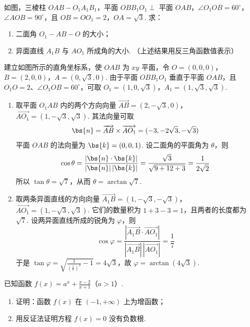 \begin{problem}
如图，三棱柱 \(OAB - O_{1}A_{1}B_{1}\)，平面 \(OBB_{1}O_{1} \perp\) 平面 \(OAB\)，\(\angle O_{1}OB = 60^{\circ}\)，\(\angle AOB = 90^{\circ}\)，且 \(OB = OO_{1} = 2\)，\(OA = \sqrt{3}\). 求：
\begin{enumerate}
\item 二面角 \(O_{1} - AB - O\) 的大小；
\item 异面直线 \(A_{1}B\) 与 \(AO_{1}\) 所成角的大小. （上述结果用反三角函数值表示）
\end{enumerate}

\end{problem}

\begin{solution}
建立如图所示的直角坐标系，使 \(OAB\) 为 \(xy\) 平面，令
\(O=(0,0,0)\)，\(B=(2,0,0)\)，\(A=(0,\sqrt3,0)\).
由于平面 \(OBB_1O_1\) 垂直于平面 \(OAB\)，且 \(O_1O=2\)、\(\angle O_1OB=60^\circ\)，可取
\(O_1=(1,0,\sqrt3)\)，\(A_1=(1,\sqrt3,\sqrt3)\).

\begin{enumerate}
\item 取平面 \(O_1AB\) 内的两个方向向量
\(\overrightarrow{AB}=(2,-\sqrt3,0)\)，\(\overrightarrow{AO_1}=(1,-\sqrt3,\sqrt3)\).
其法向量可取
\[
\bs{n}=\overrightarrow{AB}\times\overrightarrow{AO_1}=(-3,-2\sqrt3,-\sqrt3)
\]
平面 \(OAB\) 的法向量为 \(\bs{k}=(0,0,1)\). 设二面角的平面角为 \(\theta\)，则
\[
\cos\theta=\frac{|\bs{n}\cdot\bs{k}|}{|\bs{n}|\,|\bs{k}|}=\frac{\sqrt3}{\sqrt{9+12+3}}=\frac1{2\sqrt2}
\]
所以 \(\tan\theta=\sqrt7\)，从而 \(\theta=\arctan\sqrt7\).

\item 取两条异面直线的方向向量
\(\overrightarrow{A_1B}=(1,-\sqrt3,-\sqrt3)\)，\(\overrightarrow{AO_1}=(1,-\sqrt3,\sqrt3)\).
它们的数量积为 \(1+3-3=1\)，且两者的长度都为 \(\sqrt7\). 设两异面直线所成的锐角为 \(\varphi\)，则
\[
\cos\varphi=\frac{|\overrightarrow{A_1B}\cdot\overrightarrow{AO_1}|}{|\overrightarrow{A_1B}|\,|\overrightarrow{AO_1}|}=\frac17
\]
于是 \(\tan\varphi=\sqrt{\frac{1}{(\frac{1}{7})^2}-1}=4\sqrt3\)，故 \(\varphi=\arctan(4\sqrt3)\).
\end{enumerate}
\end{solution}

\begin{problem}
已知函数 \( f(x) = a^x + \frac{x - 2}{x + 1} \)（\(a > 1\)）.
\begin{enumerate}
\item 证明：函数 \( f(x) \) 在 \( (-1, +\infty) \) 上为增函数；
\item 用反证法证明方程 \( f(x)=0 \) 没有负数根.
\end{enumerate}
\end{problem}

